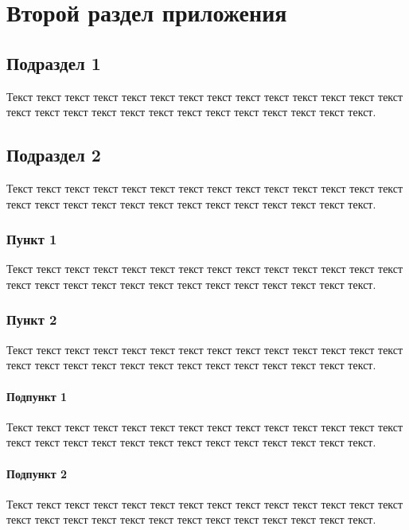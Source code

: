 \newpage
\section{Второй раздел приложения}

\subsection{Подраздел 1}
Текст текст текст текст текст текст текст текст текст текст текст текст текст текст текст текст текст текст текст текст текст текст текст текст текст текст текст.

\subsection{Подраздел 2}
Текст текст текст текст текст текст текст текст текст текст текст текст текст текст текст текст текст текст текст текст текст текст текст текст текст текст текст.

\subsubsection{Пункт 1} 
Текст текст текст текст текст текст текст текст текст текст текст текст текст текст текст текст текст текст текст текст текст текст текст текст текст текст текст.

\subsubsection{Пункт 2} 
Текст текст текст текст текст текст текст текст текст текст текст текст текст текст текст текст текст текст текст текст текст текст текст текст текст текст текст.

\paragraph{Подпункт 1} 
Текст текст текст текст текст текст текст текст текст текст текст текст текст текст текст текст текст текст текст текст текст текст текст текст текст текст текст.

\paragraph{Подпункт 2} 
Текст текст текст текст текст текст текст текст текст текст текст текст текст текст текст текст текст текст текст текст текст текст текст текст текст текст текст.
